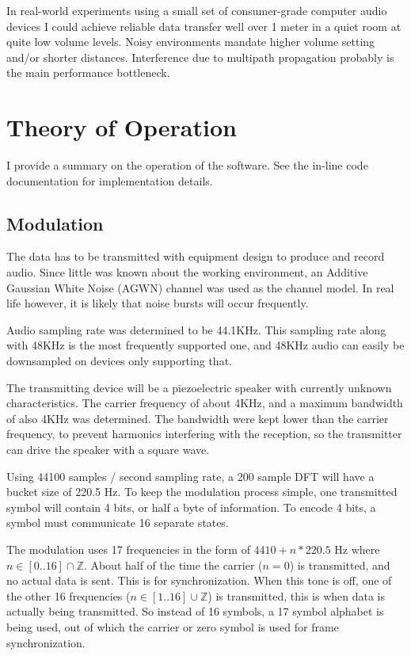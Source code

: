 \documentclass[a4paper]{article}
\begin{document}
In real-world experiments using a small set of consumer-grade computer 
audio devices I could achieve reliable data transfer well over 1 meter 
in a quiet room at quite low volume levels. Noisy environments mandate 
higher volume setting and/or shorter distances. Interference due to 
multipath propagation probably is the main performance bottleneck.

\section{Theory of Operation}

I provide a summary on the operation of the software. See the in-line
code documentation for implementation details.

\subsection{Modulation}

The data has to be transmitted with equipment design to produce and
record audio. Since little was known about the working environment,
an Additive Gaussian White Noise (AGWN) channel was used as the channel
model. In real life however, it is likely that noise bursts will occur
frequently.

Audio sampling rate was determined to be 44.1KHz. This sampling rate 
along with 48KHz is the most frequently supported one, and 48KHz audio 
can easily be downsampled on devices only supporting that.

The transmitting device will be a piezoelectric speaker with currently
unknown characteristics. The carrier frequency of about 4KHz, and a
maximum bandwidth of also 4KHz was determined. The bandwidth were kept
lower than the carrier frequency, to prevent harmonics interfering with
the reception, so the transmitter can drive the speaker with a square
wave.

Using 44100 samples / second sampling rate, a 200 sample DFT will have
a bucket size of 220.5 Hz. To keep the modulation process simple, one
transmitted symbol will contain 4 bits, or half a byte of information.
To encode 4 bits, a symbol must communicate 16 separate states.

The modulation uses 17 frequencies in the form of $4410 + n*220.5$ Hz
where $n \in [0..16] \cap \mathbb{Z}$. About half of the time the
carrier ($n=0$) is transmitted, and no actual data is sent. This is for
synchronization. When this tone is off, one of the other 16 frequencies
($n \in [1..16] \cup \mathbb{Z}$) is transmitted, this is when data is
actually being transmitted. So instead of 16 symbols, a 17 symbol
alphabet is being used, out of which the carrier or zero symbol is used
for frame synchronization.
\end{document}

